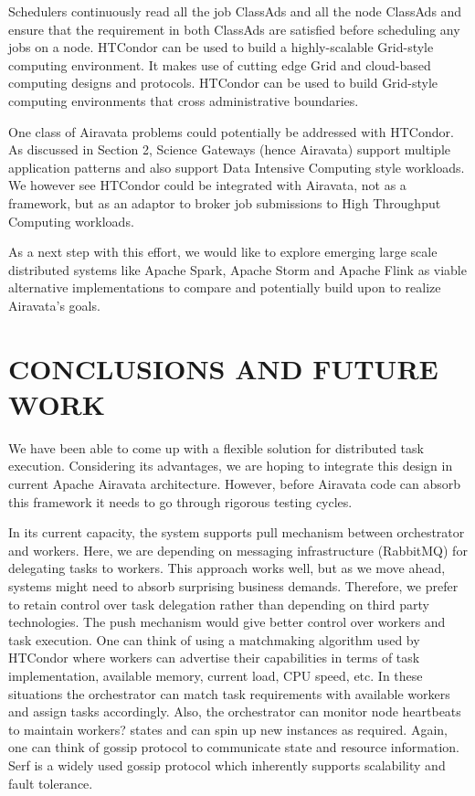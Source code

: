 \documentclass[review]{elsarticle}
\begin{document}
Schedulers continuously read all the job ClassAds and all the node ClassAds and ensure that the requirement in both ClassAds are satisfied before scheduling any jobs on a node. HTCondor can be used to build a highly-scalable Grid-style computing environment.  It makes use of cutting edge Grid and cloud-based computing designs and protocols. HTCondor can be used to build Grid-style computing environments that cross administrative boundaries. 

One class of Airavata problems could potentially be addressed with HTCondor. As discussed in Section 2,  Science Gateways (hence Airavata) support multiple application patterns and also support Data Intensive Computing style workloads. We however see HTCondor could be integrated with Airavata, not as a framework, but as an adaptor to broker job submissions to High Throughput Computing workloads.   

As a next step with this effort, we would like to explore emerging large scale distributed systems like Apache Spark, Apache Storm and Apache Flink as viable alternative implementations to compare and potentially build upon to realize Airavata's goals. 


\section{CONCLUSIONS AND FUTURE WORK}
We have been able to come up with a flexible solution for distributed task execution. Considering its advantages, we are hoping to integrate this design in current Apache Airavata architecture. However, before Airavata code can absorb this framework it needs to go through rigorous testing cycles.

In its current capacity, the system supports pull mechanism between orchestrator and workers. Here, we are depending on messaging infrastructure (RabbitMQ) for delegating tasks to workers. This approach works well, but as we move ahead, systems might need to absorb surprising business demands.  Therefore, we prefer to retain control over task delegation rather than depending on third party technologies. The push mechanism would give better control over workers and task execution. One can think of using a matchmaking algorithm used by HTCondor where workers can advertise their capabilities in terms of task implementation, available memory, current load, CPU speed, etc.  In these situations the orchestrator can match task requirements with available workers and assign tasks accordingly. Also, the orchestrator can monitor node heartbeats to maintain workers? states and can spin up new instances as required. Again, one can think of gossip protocol to communicate state and resource information. Serf is a widely used gossip protocol which inherently supports scalability and fault tolerance.  
\end{document}
